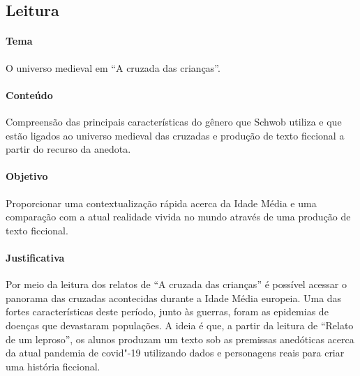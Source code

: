 \documentclass[12pt]{extarticle}
\begin{document}
\subsection{Leitura}

 \paragraph{Tema} O universo medieval em ``A cruzada das crianças''.

 \paragraph{Conteúdo} Compreensão das principais características do gênero
 que Schwob utiliza e que estão ligados ao universo medieval
 das cruzadas e produção de texto ficcional a partir do recurso da anedota.

 \paragraph{Objetivo} Proporcionar uma contextualização rápida acerca da Idade Média e
 uma comparação com a atual realidade vivida no mundo através de uma produção 
 de texto ficcional.


 \paragraph{Justificativa} Por meio da leitura dos relatos de ``A cruzada das crianças''
 é possível acessar o panorama das cruzadas acontecidas durante a Idade Média europeia.
 Uma das fortes características deste período, junto às guerras, foram as epidemias de 
 doenças que devastaram populações. A ideia é que, a partir da leitura de ``Relato 
 de um leproso'', os alunos produzam um texto sob as premissas anedóticas acerca
 da atual pandemia de covid"-19 utilizando dados e personagens reais para criar uma 
 história ficcional.
\end{document}
